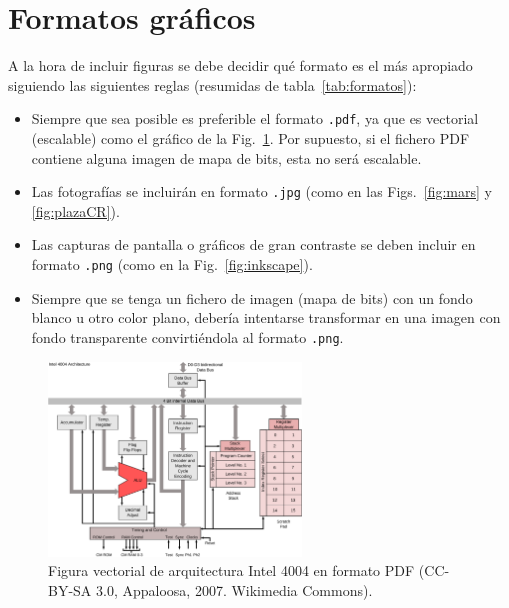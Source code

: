 \documentclass[11pt,a4paper]{article}
\begin{document}
\section{Formatos gráficos}
A la hora de incluir figuras se debe decidir qué formato es el más apropiado siguiendo las siguientes reglas (resumidas de tabla~\ref{tab:formatos}):
\begin{itemize}
	\item Siempre que sea posible es preferible el formato \texttt{.pdf}, ya que es vectorial (escalable) como el gráfico de la Fig.~\ref{fig:4004arch}. Por supuesto, si el fichero \textsf{PDF} contiene alguna imagen de mapa de bits, esta no será escalable.
	\item Las fotografías se incluirán en formato \texttt{.jpg} (como en las  Figs.~\ref{fig:mars} y \ref{fig:plazaCR}).
	\item Las capturas de pantalla o gráficos de gran contraste se deben incluir en formato \texttt{.png} (como en la Fig.~\ref{fig:inkscape}). 
	\item Siempre que se tenga un fichero de imagen (mapa de bits) con un fondo blanco u otro color plano, debería intentarse transformar en una imagen con fondo transparente convirtiéndola al formato \texttt{.png}.
\end{itemize}

\begin{figure}[hbt]
	\centering 
	\includegraphics[width=0.6\textwidth]{4004arch} 
	\caption[Ejemplo de gráfico vectorial \textsf{PDF}]{Figura vectorial de arquitectura Intel 4004 en formato \textsf{PDF} (CC-BY-SA 3.0, Appaloosa, 2007. Wikimedia Commons).}
	\label{fig:4004arch}
\end{figure}
\end{document}
